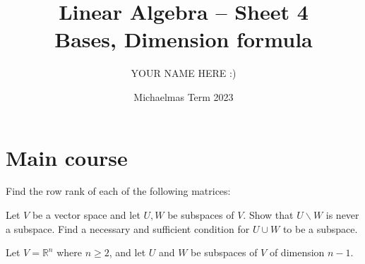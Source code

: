 \documentclass[answers]{exam}
\title{Linear Algebra -- Sheet 4\\Bases, Dimension formula}
\author{YOUR NAME HERE :)}
\date{Michaelmas Term 2023}
\newcommand*{\bump}{\vspace{1em}\phantom{}\vspace{-1.75em}}
\begin{document}
\maketitle
\section*{Main course}
\begin{questions}

\question%
Find the row rank of each of the following matrices:
\begin{parts}
\part%
\bump \[
	\begin{pmatrix}
		2 & 4 & -3 & 0 \\
		1 & -4 & 3 & 0 \\
		3 & -5 & 2 & 1
	\end{pmatrix}
\]

\part%
\bump \[
	\begin{pmatrix}
		1 & 2 & 3 & 0 \\
		2 & 3 & 4 & 1 \\
		3 & 4 & 5 & 2
	\end{pmatrix}
\]

\part%
\bump \[
	\begin{pmatrix}
		1 & 2 & 3 & 0 \\
		2 & 3 & 4 & 2 \\
		3 & 4 & 5 & 2
	\end{pmatrix}
\]
\end{parts}



\question%
Let $V$ be a vector space and let $U, W$ be subspaces of $V$. Show that $U \backslash W$ is never a subspace. Find a necessary and sufficient condition for $U \cup W$ to be a subspace.



\question%
Let $V=\mathbb{R}^{n}$ where $n \geqslant 2$, and let $U$ and $W$ be subspaces of $V$ of dimension $n-1$.
\end{questions}
\end{document}
